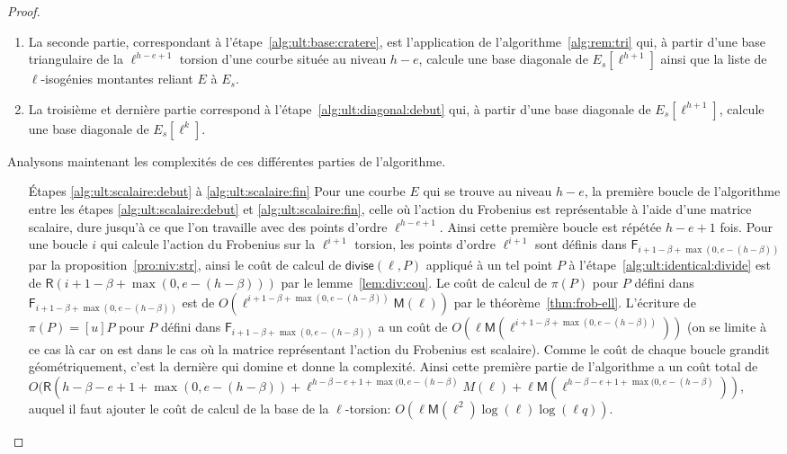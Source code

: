 \documentclass[10pt,a4paper]{book}
\theoremstyle{plain}
\theoremstyle{definition}
\theoremstyle{definition}
\theoremstyle{definition}
\theoremstyle{definition}
\theoremstyle{definition}
\theoremstyle{remark}
\theoremstyle{remark}
\theoremstyle{definition}
\begin{document}
\begin{proof}
\begin{enumerate}
\item La seconde partie, correspondant à l'étape~\ref{alg:ult:base:cratere}, est
l'application de l'algorithme~\ref{alg:rem:tri} qui, à partir d'une base 
triangulaire de la $\ell^{h-e+1}$ torsion d'une courbe située au niveau $h-e$,
calcule une base diagonale de $E_s[\ell^{h+1}]$ ainsi que la liste de
$\ell$-isogénies montantes reliant $E$ à $E_s$.
\item La troisième et dernière partie correspond à 
l'étape~\ref{alg:ult:diagonal:debut} qui, à partir d'une base diagonale de 
$E_s[\ell^{h+1}]$, calcule une base diagonale de $E_s[\ell^k]$.
\end{enumerate}
Analysons maintenant les complexités de ces différentes parties de 
l'algorithme.
\begin{enumerate}
\item[\'Etapes \ref{alg:ult:scalaire:debut} à \ref{alg:ult:scalaire:fin}]
Pour une courbe $E$ qui se trouve au niveau $h-e$, la première boucle de l'algorithme entre les étapes \ref{alg:ult:scalaire:debut} et \ref{alg:ult:scalaire:fin}, celle où l'action du 
Frobenius est représentable à l'aide d'une matrice scalaire, dure jusqu'à ce 
que l'on travaille avec des points d'ordre $\ell^{h-e+1}$. Ainsi cette première
 boucle est répétée $h-e+1$ fois. Pour une boucle $i$ qui calcule l'action du 
 Frobenius sur la $\ell^{i+1}$ torsion, les points d'ordre $\ell^{i+1}$ 
sont définis dans $\mathsf{F}_{i+1-\beta+\max(0,e-(h-\beta))}$ par la 
proposition~\ref{pro:niv:str}, ainsi le coût de calcul de 
$\mathsf{divise}(\ell,P)$ appliqué à un tel point $P$ à 
l'étape~\ref{alg:ult:identical:divide} est de $\mathsf{R}(i+1-\beta+\max(0,e-
(h-\beta)))$ par le lemme~\ref{lem:div:cou}. Le coût de calcul de $\pi(P)$ pour
$P$ défini dans $\mathsf{F}_{i+1-\beta+\max(0,e-(h-\beta))}$ est de 
$O(\ell^{i+1-\beta+\max(0,e-(h-\beta))}\mathsf{M}(\ell))$ par le 
théorème~\ref{thm:frob-ell}. L'écriture de $\pi(P)=[u]P$ pour $P$ défini dans 
$\mathsf{F}_{i+1-\beta+\max(0,e-(h-\beta))}$
a un coût de $O(\ell \mathsf{M}(\ell^{i+1- \beta+\max(0,e-(h-\beta))}))$
(on se limite à ce cas là car on est dans le cas où la matrice représentant 
l'action du Frobenius est scalaire). Comme le coût de chaque boucle grandit 
géométriquement, c'est la dernière qui domine et donne la 
complexité. Ainsi cette première partie de l'algorithme a un coût 
 total de $O(\mathsf{R}(h-\beta-e+1 +\max(0,e-(h-\beta))+\ell^{h-\beta-e+1+
\max(0,e-(h-\beta)}M(\ell)+\ell\mathsf{M}(\ell^{h-\beta-e+1+
\max(0,e-(h-\beta)}))$, auquel il faut ajouter le coût de calcul de la base de 
la $\ell$-torsion: $O(\ell\mathsf{M}(\ell^2)\log(\ell)\log(\ell q))$.


\end{enumerate}
\end{proof}
\end{document}
